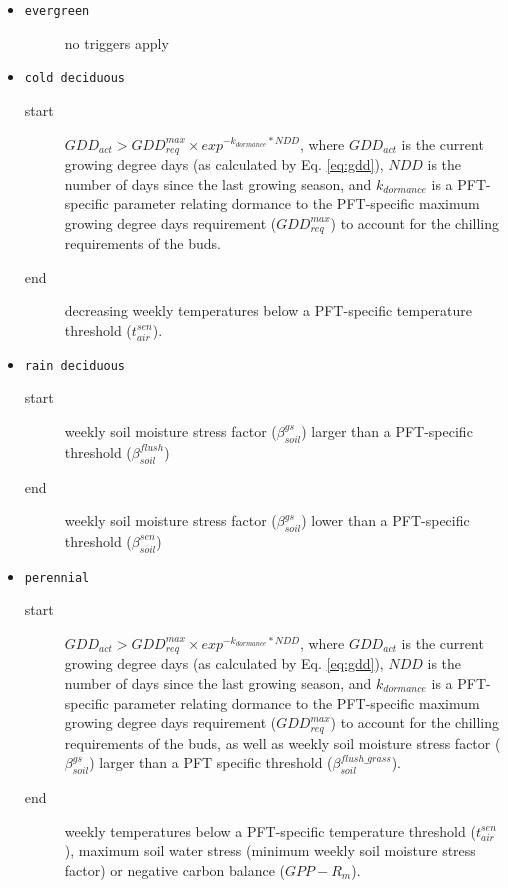 \begin{itemize}

\item \texttt{evergreen} 
\begin{description}
\item[] no triggers apply
\end{description}

\item \texttt{cold deciduous}
\begin{description}
\item[start] $GDD_{act} > GDD_{req}^{max} \times exp^{- k_{dormance}*NDD}$, where $GDD_{act}$ is the current growing degree days (as calculated by Eq. \ref{eq:gdd}), $NDD$ is the number of days since the last growing season, and $k_{dormance}$ is a PFT-specific parameter relating dormance to the PFT-specific maximum growing degree days requirement ($GDD_{req}^{max}$) to account for the chilling requirements of the buds.
\item[end] decreasing weekly temperatures below a PFT-specific temperature threshold ($t_{air}^{sen}$).
\end{description}

\item \texttt{rain deciduous}
\begin{description}
\item[start] weekly soil moisture stress factor ($\beta_{soil}^{gs}$) larger than a PFT-specific threshold ($\beta_{soil}^{flush}$) 
\item[end] weekly soil moisture stress factor ($\beta_{soil}^{gs}$) lower than a PFT-specific threshold ($\beta_{soil}^{sen}$)
\end{description}

\item \texttt{perennial}
\begin{description}
\item[start] $GDD_{act} > GDD_{req}^{max} \times exp^{- k_{dormance}*NDD}$, where $GDD_{act}$ is the current growing degree days (as calculated by Eq. \ref{eq:gdd}), $NDD$ is the number of days since the last growing season, and $k_{dormance}$ is a PFT-specific parameter relating dormance to the PFT-specific maximum growing degree days requirement ($GDD_{req}^{max}$) to account for the chilling requirements of the buds, as well as weekly soil moisture stress factor ($\beta_{soil}^{gs}$) larger than a PFT specific threshold ($\beta_{soil}^{flush\_grass}$).
\item[end] weekly temperatures below a PFT-specific temperature threshold ($t_{air}^{sen}$), maximum soil water stress (minimum weekly soil moisture stress factor) or negative carbon balance ($GPP - R_m$).
\end{description}

\end{itemize}

